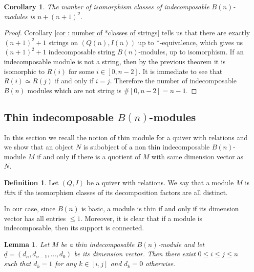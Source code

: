 \documentclass[11pt]{amsart}
\newtheorem{corollary}[theorem]{Corollary}
\newtheorem{lemma}[theorem]{Lemma}
\theoremstyle{definition}
\newtheorem{definition}[theorem]{Definition}
\newcommand{\kk}{\mathbbm{k}}
\begin{document}
\begin{corollary}
    The number of isomorphism classes of indecomposable $B(n)$-modules is $n+(n+1)^2$. 
\end{corollary}
\begin{proof} Corollary \ref{cor : number of *classes of strings} tells us that there are exactly $(n+1)^2+1$ strings on $(Q(n), I(n))$ up to $*$-equivalence, which gives us $(n+1)^2+1$ indecomposable string $B(n)$-modules, up to isomorphism. If an indecomposable module is not a string, then  by the previous theorem it is isomorphic to $R(i)$ for some $i\in[0,n-2]$. It is immediate to see that $R(i)\simeq R(j)$ if and only if $i=j$. Therefore the number of indecomposable $B(n)$ modules which are not string is $\#[0,n-2]=n-1$.
\end{proof}

\subsection{Thin indecomposable $B(n)$-modules}In this section we recall the notion of thin module for a quiver with relations and we show that an  object $N$ is subobject of a non thin indecomposable $B(n)$-module $M$ if and only if there is a quotient of $M$ with same dimension vector as $N$. 

\begin{definition}Let $(Q,I)$ be a quiver with relations. We say that a module $M$ is \emph{thin} if the isomorphism classes of its decomposition factors are all distinct. 
\end{definition}
In our case, since $B(n)$ is basic, a module is thin if and only if its dimension vector has all entries $\leq 1$. Moreover, it is clear that if a module is indecomposable, then its support is connected.

\begin{lemma}\label{lemma : description_of_rooty}
    Let $M$ be a thin indecomposable $B(n)$-module and let $\underline{d}=(d_n, d_{n-1}, \ldots, d_0)$ be its dimension vector. Then there exist $0\leq i\leq j\leq n$ such that $d_k=1$ for any $k\in[i,j]$ and $d_k=0$ otherwise.
\end{lemma}
    
\end{document}

